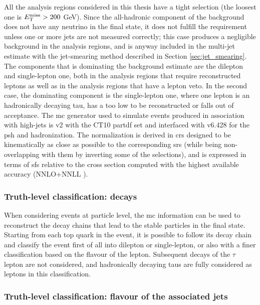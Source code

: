 All the analysis regions considered in this thesis have a tight \met selection (the loosest one is $E_{\rm T}^{\mathrm{miss}} > 200$ GeV). Since the all-hadronic component 
of the \ttbar background does not have any neutrino in the final state, it does not fulfill the \met requirement unless one or more jets are not measured correctly; this case produces a negligible background in the analysis regions, and is anyway included in the multi-jet estimate with the jet-smearing method described in Section \ref{sec:jet_smearing}.
The \ttbar components that is dominating the background estimate are the dilepton and single-lepton one, both in the analysis regions that require reconstructed leptons as well as in the analysis regions that have a lepton veto.
In the second case, the dominating component is the single-lepton one, where one lepton is an hadronically decaying tau, has a \pt too low to be reconstructed or falls out of acceptance. 
The \gls{mc} generator used to simulate \ttbar events produced in association with high-\pt jets is \PowhegBox v2 with the CT10 \gls{partdf} set \cite{Lai:2010vv} and interfaced with \PY v6.428 \cite{Sjostrand:2006za} for the \gls{psh} and hadronization. 
The normalization is derived in \glspl{cr} designed to be kinematically as close as possible to the corresponding \glspl{sr} (while being non-overlapping with them by inverting some of the selections), and is expressed in terms of \glspl{sf} relative to the cross section computed with the highest
available accuracy (NNLO+NNLL \cite{Czakon:2011xx}).

\subsubsection*{Truth-level classification: \ttbar decays}

When considering events at particle level,
the \gls{mc} information can be used to reconstruct the decay chains that lead to the stable particles in the final state. 
Starting from each top quark in the event, it is possible to follow its decay chain and classify the event first of all into dilepton or single-lepton, or also with a finer classification based on the flavour of the lepton. 
Subsequent decays of the $\tau$ lepton are not considered, and hadronically decaying taus are fully considered as leptons in this classification. 

\subsubsection*{Truth-level classification: flavour of the associated jets}

